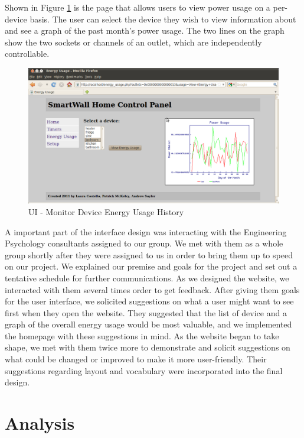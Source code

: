 \documentclass[12pt]{article}
\begin{document}
Shown in Figure \ref{fig:webUI-energy} is the page that allows users
to view power usage on
a per-device basis. The user can select the device they wish to
view information about and see a graph of the past month’s power
usage. The two lines on the graph show the two sockets or
channels of an outlet, which are independently controllable. 

\begin{figure}
  \begin{center}
    \includegraphics[scale=.3]{webUI-energy.png}
  \end{center}
  \caption{UI - Monitor Device Energy Usage History}
  \label{fig:webUI-energy}
\end{figure}

A important part of the interface design was interacting with the
Engineering Psychology consultants assigned to our group. We met with
them as a whole group shortly after they were assigned to us in order
to bring them up to speed on our project. We explained our premise
and goals for the project and set out a tentative schedule for
further communications. As we designed the website, we interacted
with them several times order to get feedback. After giving them
goals for the user interface, we solicited suggestions on what a user
might want to see first when they open the website. They suggested
that the list of device and a graph of the overall energy usage would
be most valuable, and we implemented the homepage with these
suggestions in mind. As the website began to take shape, we met with
them twice more to demonstrate and solicit suggestions on what could
be changed or improved to make it more user-friendly. Their
suggestions regarding layout and vocabulary were incorporated into
the final design. 

\section{Analysis}
\end{document}
